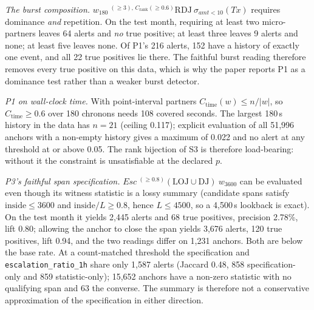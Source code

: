 \documentclass[10pt]{article}
\newcommand{\tf}[1]{\texttt{#1}}
\newcommand{\rel}[1]{\mathit{#1}}
\newcommand{\op}[1]{\mathrm{#1}}
\newcommand{\lc}[1]{{}^{(#1)}\!}
\begin{document}
\emph{The burst composition.} $w_{180}\ {}^{(\geq 3),\,C_{\mathrm{rank}}(\geq 0.6)}\!\op{RDJ}\ \sigma_{\rel{amt}<10}(\rel{Tx})$ requires dominance \emph{and} repetition. On the test month, requiring at least two micro-partners leaves 64 alerts and \emph{no} true positive; at least three leaves 9 alerts and none; at least five leaves none. Of P1's 216 alerts, 152 have a history of exactly one event, and all 22 true positives lie there. The faithful burst reading therefore removes every true positive on this data, which is why the paper reports P1 as a dominance test rather than a weaker burst detector.

\emph{P1 on wall-clock time.} With point-interval partners $C_{\mathrm{time}}(w)\le n/|w|$, so $C_{\mathrm{time}}\ge 0.6$ over 180 chronons needs 108 covered seconds. The largest 180\,s history in the data has $n=21$ (ceiling 0.117); explicit evaluation of all 51,996 anchors with a non-empty history gives a maximum of 0.022 and no alert at any threshold at or above 0.05. The rank bijection of S3 is therefore load-bearing: without it the constraint is unsatisfiable at the declared $p$.

\emph{P3's faithful span specification.} $\rel{Esc}\ \lc{\geq 0.8}(\op{LOJ}\cup\op{DJ})\ w_{3600}$ can be evaluated even though its witness statistic is a lossy summary (candidate spans satisfy $\mathrm{inside}\le 3600$ and $\mathrm{inside}/L\ge 0.8$, hence $L\le 4500$, so a 4{,}500\,s lookback is exact). On the test month it yields 2,445 alerts and 68 true positives, precision 2.78\%, lift 0.80; allowing the anchor to close the span yields 3,676 alerts, 120 true positives, lift 0.94, and the two readings differ on 1,231 anchors. Both are below the base rate. At a count-matched threshold the specification and \tf{escalation\_ratio\_1h} share only 1,587 alerts (Jaccard 0.48, 858 specification-only and 859 statistic-only); 15,652 anchors have a non-zero statistic with no qualifying span and 63 the converse. The summary is therefore not a conservative approximation of the specification in either direction.
\end{document}
